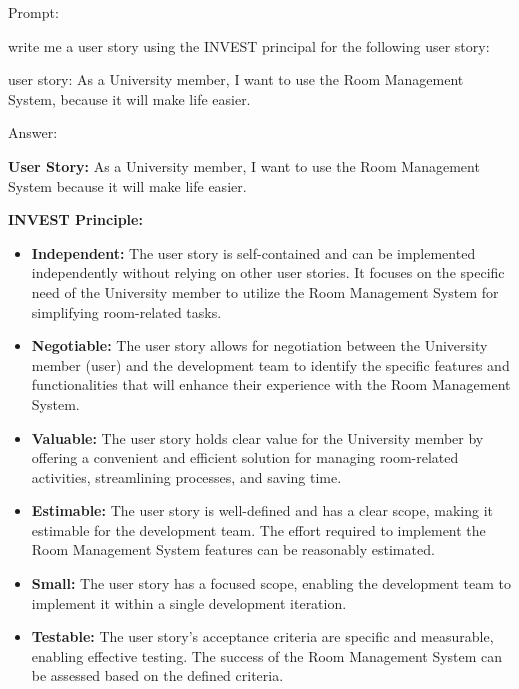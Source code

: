 \documentclass[conference,onecolumn]{IEEEtran}
\begin{document}
Prompt:
\begin{framed}
	\small
	write me a user story using the INVEST principal for the following user story:
	
	user story: 
	As a University member, I want to use the Room Management System, because it will make life easier.
\end{framed}

Answer:
\begin{framed}
	\small
	\textbf{User Story:} As a University member, I want to use the Room Management System because it will make life easier.
	
	\textbf{INVEST Principle:}
	
	\begin{itemize}
		\item \textbf{Independent:} The user story is self-contained and can be implemented independently without relying on other user stories. It focuses on the specific need of the University member to utilize the Room Management System for simplifying room-related tasks.
		
		\item \textbf{Negotiable:} The user story allows for negotiation between the University member (user) and the development team to identify the specific features and functionalities that will enhance their experience with the Room Management System.
		
		\item \textbf{Valuable:} The user story holds clear value for the University member by offering a convenient and efficient solution for managing room-related activities, streamlining processes, and saving time.
		
		\item \textbf{Estimable:} The user story is well-defined and has a clear scope, making it estimable for the development team. The effort required to implement the Room Management System features can be reasonably estimated.
		
		\item \textbf{Small:} The user story has a focused scope, enabling the development team to implement it within a single development iteration.
		
		\item \textbf{Testable:} The user story's acceptance criteria are specific and measurable, enabling effective testing. The success of the Room Management System can be assessed based on the defined criteria.
	\end{itemize}
	

\end{framed}
\end{document}
